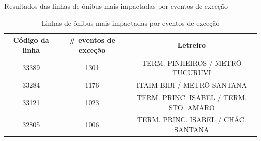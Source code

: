 \documentclass{beamer}
\begin{document}
\begin{frame}{Resultados das linhas de ônibus mais impactadas por eventos de exceção}
\begin {table} [!htb]
\centering
\begin{adjustbox}{max height=10mm, width=4in}
\begin{threeparttable}
\caption {Linhas de ônibus mais impactadas por eventos de exceção}
\label {tab:impacted_bus_code_lines}
\begin {tabular} {c|c|c}
 \toprule
\textbf{Código da linha} & \textbf{\# eventos de exceção} & \textbf{Letreiro} \\
    \midrule
    33389 & 1301  & TERM. PINHEIROS / METRÔ TUCURUVI  \\
\hline

    33284 & 1176  & ITAIM BIBI / METRÔ SANTANA  \\
\hline

    33121 & 1023  & TERM. PRINC. ISABEL / TERM. STO. AMARO  \\
\hline

    32805 & 1006  & TERM. PRINC. ISABEL / CHÁC. SANTANA  \\
\hline


\end{tabular}
\end{threeparttable}
\end{adjustbox}
\end{table}
\end{frame}
\end{document}
